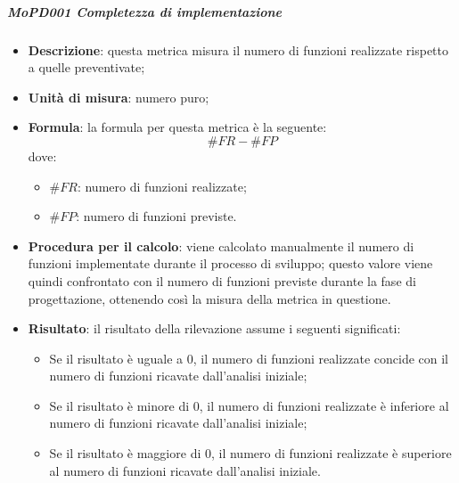 \documentclass[../norme-di-progetto.tex]{subfiles}
\begin{document}
\subparagraph{MoPD001 Completezza di implementazione}
\begin{itemize}
  \item \textbf{Descrizione}: questa metrica misura il numero di funzioni realizzate rispetto a quelle preventivate;
  \item \textbf{Unità di misura}: numero puro;
  \item \textbf{Formula}: la formula per questa metrica è la seguente:
  \begin{displaymath}
    \#FR - \#FP
  \end{displaymath}
  dove:
  \begin{itemize}
    \item $ \#FR $: numero di funzioni realizzate;
    \item $ \#FP $: numero di funzioni previste.
  \end{itemize}
  \item \textbf{Procedura per il calcolo}: viene calcolato manualmente il numero di funzioni implementate durante il processo di sviluppo; questo valore viene quindi confrontato con il numero di funzioni previste durante la fase di progettazione, ottenendo così la misura della metrica in questione.
  \item \textbf{Risultato}: il risultato della rilevazione assume i seguenti significati:
  \begin{itemize}
    \item Se il risultato è uguale a 0, il numero di funzioni realizzate concide con il numero di funzioni ricavate dall'analisi iniziale;
    \item Se il risultato è minore di 0, il numero di funzioni realizzate è inferiore al numero di funzioni ricavate dall'analisi iniziale;
    \item Se il risultato è maggiore di 0, il numero di funzioni realizzate è superiore al numero di funzioni ricavate dall'analisi iniziale.
  \end{itemize}
\end{itemize}
\end{document}
